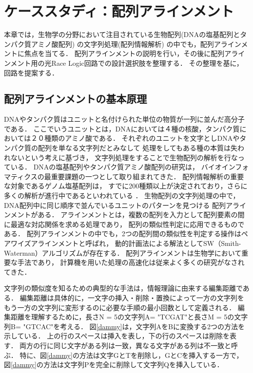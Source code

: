 \chapter{ケーススタディ：配列アラインメント}
本章では，生物学の分野において注目されている生物配列(DNAの塩基配列とタンパク質アミノ酸配列) の文字列処理(配列情報解析) 
\cite{浅井潔2000配列情報と確立モデル,後藤修1998マルチプルアラインメントは生体高分子情報の交差点}の中でも，配列アラインメントに焦点を当てる．
配列アラインメントの説明を行い，その後に配列アラインメント用の光Race Logic回路での設計選択肢を整理する．
その整理を基に，回路を提案する．

\section{配列アラインメントの基本原理}
DNAやタンパク質はユニットと名付けられた単位の物質が一列に並んだ高分子である．
ここでいうユニットとは，DNAにおいては４種の核酸，タンパク質においては２０種類のアミノ酸である．
それぞれのユニットを文字としDNAやタンパク質の配列を単なる文字列だとみなして
処理をしてもある種の本質は失われないという考えに基づき，
文字列処理をすることで生物配列の解析を行なっている．
DNAの塩基配列やタンパク質アミノ酸配列の研究は，
バイオインフォマティクスの最重要課題の一つとして取り組まれてきた．
配列情報解析の重要な対象であるゲノム塩基配列は，
すでに200種類以上が決定されており，さらに多くの解析が進行中であるといわれている
\cite{浅井潔2005バイオインフォマティクス}．
生物配列の文字列処理の中で，DNA配列中に同じ順序で並んでいるユニットのパターンを見つける
配列アラインメントがある\cite{須戸里織2011バイオインフォマティクスゲノム配列から機能解析へバイオインフォマティクスゲノム配列から機能解析へ}．
アラインメントとは，複数の配列を入力として配列要素の間に最適な対応関係を求める処理であり，
配列の類似性判定に応用できるものである．
配列アラインメントの中でも，2つの配列間の類似性を判定する操作はペアワイズアラインメントと呼ばれ，
動的計画法による解法としてSW（Smith-Waterman）アルゴリズム\cite{smith1981identification}が存在する．
配列アラインメントは生物学において重要な手法であり，
計算機を用いた処理の高速化は従来よく多くの研究がなされてきた\cite{須戸里織2011gpu,宗川裕馬2008統合開発環境,sandes2011smith,liu2015accelerating,伊野文彦2007gpu}．

文字列の類似度を知るための典型的な手法は，情報理論に由来する編集距離である．
編集距離は具体的に，一文字の挿入・削除・置換によって一方の文字列をもう一方の文字列に変形するのに必要な手順の最小回数として定義される．
編集距離を理解するために，長さN = 5の文字列A= "TCGAT"と長さM = 5の文字列B= "GTCAC"を考える．
図\ref{dammy}は，文字列AをBに変換する2つの方法を示している．
上の行のスペースは挿入を表し，下の行のスペースは削除を表す．
両方の行に同じ文字がある列は一致，異なる文字がある列は不一致と呼ぶ．
特に、図\ref{dammy}の方法は文字GとTを削除し，GとCを挿入する一方で，図\ref{dammy}の方法は文字列Pを完全に削除して文字列Qを挿入している．

